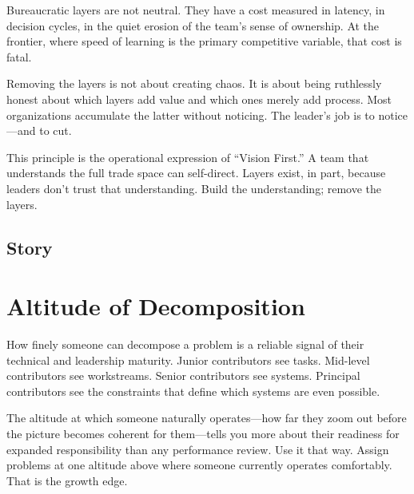 
Bureaucratic layers are not neutral. They have a cost measured in latency, in
decision cycles, in the quiet erosion of the team's sense of ownership. At the
frontier, where speed of learning is the primary competitive variable, that cost
is fatal.

Removing the layers is not about creating chaos. It is about being ruthlessly
honest about which layers add value and which ones merely add process. Most
organizations accumulate the latter without noticing. The leader's job is to
notice---and to cut.

This principle is the operational expression of ``Vision First.'' A team that
understands the full trade space can self-direct. Layers exist, in part, because
leaders don't trust that understanding. Build the understanding; remove the layers.


\subsection{Story}

\section{Altitude of Decomposition}


How finely someone can decompose a problem is a reliable signal of their technical
and leadership maturity. Junior contributors see tasks. Mid-level contributors see
workstreams. Senior contributors see systems. Principal contributors see the
constraints that define which systems are even possible.

The altitude at which someone naturally operates---how far they zoom out before
the picture becomes coherent for them---tells you more about their readiness for
expanded responsibility than any performance review. Use it that way. Assign
problems at one altitude above where someone currently operates comfortably.
That is the growth edge.

